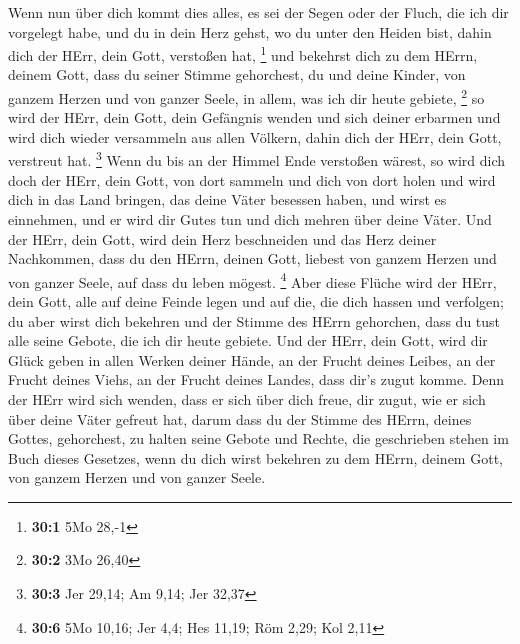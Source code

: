  Wenn nun über dich kommt dies alles, es sei der Segen oder
der Fluch, die ich dir vorgelegt habe, und du in dein Herz gehst, wo du
unter den Heiden bist, dahin dich der HErr, dein Gott, verstoßen hat,
\footnote{\textbf{30:1} 5Mo 28,-1}  und bekehrst dich zu dem
HErrn, deinem Gott, dass du seiner Stimme gehorchest, du und deine
Kinder, von ganzem Herzen und von ganzer Seele, in allem, was ich dir
heute gebiete, \footnote{\textbf{30:2} 3Mo 26,40}  so wird
der HErr, dein Gott, dein Gefängnis wenden und sich deiner erbarmen und
wird dich wieder versammeln aus allen Völkern, dahin dich der HErr, dein
Gott, verstreut hat. \footnote{\textbf{30:3} Jer 29,14; Am 9,14; Jer
  32,37}  Wenn du bis an der Himmel Ende verstoßen wärest,
so wird dich doch der HErr, dein Gott, von dort sammeln und dich von
dort holen  und wird dich in das Land bringen, das deine
Väter besessen haben, und wirst es einnehmen, und er wird dir Gutes tun
und dich mehren über deine Väter.  Und der HErr, dein Gott,
wird dein Herz beschneiden und das Herz deiner Nachkommen, dass du den
HErrn, deinen Gott, liebest von ganzem Herzen und von ganzer Seele, auf
dass du leben mögest. \footnote{\textbf{30:6} 5Mo 10,16; Jer 4,4; Hes
  11,19; Röm 2,29; Kol 2,11}  Aber diese Flüche wird der
HErr, dein Gott, alle auf deine Feinde legen und auf die, die dich
hassen und verfolgen;  du aber wirst dich bekehren und der
Stimme des HErrn gehorchen, dass du tust alle seine Gebote, die ich dir
heute gebiete.  Und der HErr, dein Gott, wird dir Glück
geben in allen Werken deiner Hände, an der Frucht deines Leibes, an der
Frucht deines Viehs, an der Frucht deines Landes, dass dir's zugut
komme. Denn der HErr wird sich wenden, dass er sich über dich freue, dir
zugut, wie er sich über deine Väter gefreut hat,  darum
dass du der Stimme des HErrn, deines Gottes, gehorchest, zu halten seine
Gebote und Rechte, die geschrieben stehen im Buch dieses Gesetzes, wenn
du dich wirst bekehren zu dem HErrn, deinem Gott, von ganzem Herzen und
von ganzer Seele.

